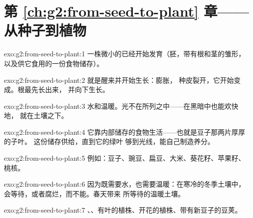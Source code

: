 \section*{第 \ref{ch:g2:from-seed-to-plant} 章——从种子到植物}

\begin{solution}{exo:g2:from-seed-to-plant:1}
一株微小的已经开始发育（胚，带有根和茎的雏形，
以及供它食用的一份食物储存）。
\end{solution}

\begin{solution}{exo:g2:from-seed-to-plant:2}
就是醒来并开始生长：膨胀，
种皮裂开，它开始变成。根最先长出来，
并向下生长。
\end{solution}

\begin{solution}{exo:g2:from-seed-to-plant:3}
水和温暖。光不在所列之中——在黑暗中也能欢快地，
就在土壤之下。
\end{solution}

\begin{solution}{exo:g2:from-seed-to-plant:4}
它靠内部储存的食物生活——也就是豆子那两片厚厚的子叶。
这份储存供给，直到它的绿叶
够到光线，能自己制造养分。
\end{solution}

\begin{solution}{exo:g2:from-seed-to-plant:5}
例如：豆子、豌豆、扁豆、大米、葵花籽、苹果籽、
桃核。
\end{solution}

\begin{solution}{exo:g2:from-seed-to-plant:6}
因为既需要水，也需要温暖：在寒冷的冬季土壤中，
会等待，或者腐烂，而不能。春天带来
所等待的温暖土壤。
\end{solution}

\begin{solution}{exo:g2:from-seed-to-plant:7}
、、有叶的植株、开花的植株、带有新豆子的豆荚。
\end{solution}


